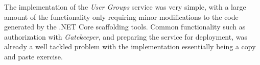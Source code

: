 The implementation of the \textit{User Groups} service was very simple, with a large amount of the functionality only requiring minor modifications to the code generated by the .NET Core scaffolding tools.  Common functionality such as authorization with \textit{Gatekeeper}, and preparing the service for deployment, was already a well tackled problem with the implementation essentially being a copy and paste exercise. 
